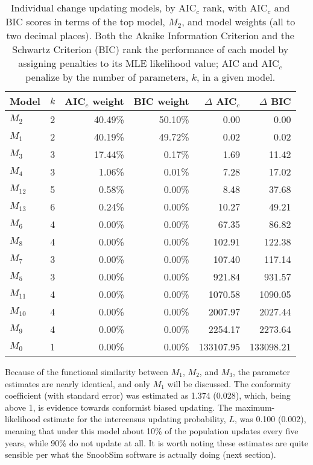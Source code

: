 \documentclass[11pt]{article}
\begin{document}
 
\begin{table}[htbp]
  \centering
    \begin{tabular}{lrrrrr}
  	\hline
  	\hline
    Model & $k$ & AIC$_c$ weight & BIC weight & $\Delta$ AIC$_c$ & $\Delta$ BIC \\
   	\hline
    $M_2$  & 2     & 40.49\% & 50.10\% & 0.00  & 0.00 \\
    $M_1$  & 2     & 40.19\% & 49.72\% & 0.02  & 0.02 \\
    $M_3$  & 3     & 17.44\% & 0.17\% & 1.69  & 11.42 \\
    $M_4$  & 3     & 1.06\% & 0.01\% & 7.28  & 17.02 \\
    $M_{12}$ & 5     & 0.58\% & 0.00\% & 8.48  & 37.68 \\
    $M_{13}$ & 6     & 0.24\% & 0.00\% & 10.27 & 49.21 \\
    $M_6$  & 4     & 0.00\% & 0.00\% & 67.35 & 86.82 \\
    $M_8$  & 4     & 0.00\% & 0.00\% & 102.91 & 122.38 \\
    $M_7$  & 3     & 0.00\% & 0.00\% & 107.40 & 117.14 \\
    $M_5$  & 3     & 0.00\% & 0.00\% & 921.84 & 931.57 \\
    $M_{11}$ & 4     & 0.00\% & 0.00\% & 1070.58 & 1090.05 \\
    $M_{10}$ & 4     & 0.00\% & 0.00\% & 2007.97 & 2027.44 \\
    $M_9$  & 4     & 0.00\% & 0.00\% & 2254.17 & 2273.64 \\
    $M_0$  & 1     & 0.00\% & 0.00\% & 133107.95 & 133098.21 \\
    \hline
    \end{tabular}%
    \caption{Individual change updating models, by AIC$_c$ rank, with AIC$_c$ and BIC scores in terms of the top model, $M_2$, and model weights (all to two decimal places).  Both the Akaike Information Criterion and the Schwartz Criterion (BIC) rank the performance of each model by assigning penalties to its MLE likelihood value; AIC and AIC$_c$ penalize by the number of parameters, $k$, in a given model.}
  \label{tab:ichangemodels}%
\end{table}%

Because of the functional similarity between $M_1$, $M_2$, and $M_3$, the parameter estimates are nearly identical, and only $M_1$ will be discussed.  The conformity coefficient (with standard error) was estimated as 1.374 (0.028), which, being above 1, is evidence towards conformist biased updating.  The maximum-likelihood estimate for the intercensus updating probability, $L$, was 0.100 (0.002), meaning that under this model about 10\% of the population updates every five years, while 90\% do not update at all.  It is worth noting these estimates are quite sensible per what the SnoobSim software is actually doing (next section).
\end{document}
